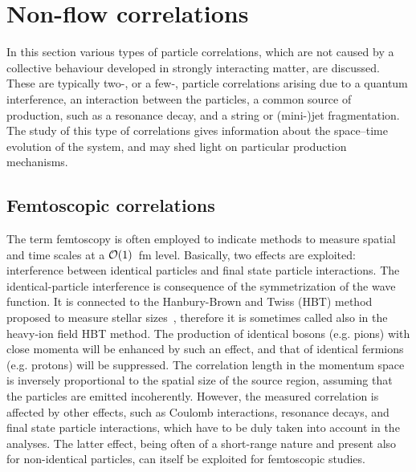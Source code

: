 \section{Non-flow correlations}
\label{secks:nonflow}
In this section various types of particle correlations, which are not caused by a collective behaviour developed in strongly interacting matter, are discussed. These are typically two-, or a few-, particle correlations arising due to a quantum interference, an interaction between the particles, a common source of production, such as a resonance decay, and a string or (mini-)jet fragmentation. The study of this type of correlations gives information about the space--time evolution of the system, and may shed light on particular production mechanisms.
\subsection{Femtoscopic correlations}
\label{subsecks:femto}
The term femtoscopy is often employed to indicate methods to measure spatial and time scales at a ${\cal O}(1)$~fm level. Basically, two effects are exploited: interference between identical particles and final state particle interactions. The identical-particle interference is consequence of the symmetrization of the wave function. It is connected to the Hanbury-Brown and Twiss (HBT) method proposed to measure stellar sizes~\cite{HanburyBrown:1954wr}, therefore it is sometimes called also in the heavy-ion field HBT method. The production of identical bosons (e.g. pions) with close momenta will be enhanced by such an effect, and that of identical fermions (e.g. protons) will be suppressed. The correlation length in the momentum space is inversely proportional to the spatial size of the source region, assuming that the particles are emitted incoherently. However, the measured correlation is affected by other effects, such as Coulomb interactions, resonance decays, and final state particle interactions, which have to be duly taken into account in the analyses. The latter effect, being often of a short-range nature and present also for non-identical particles, can itself be exploited for femtoscopic studies.

